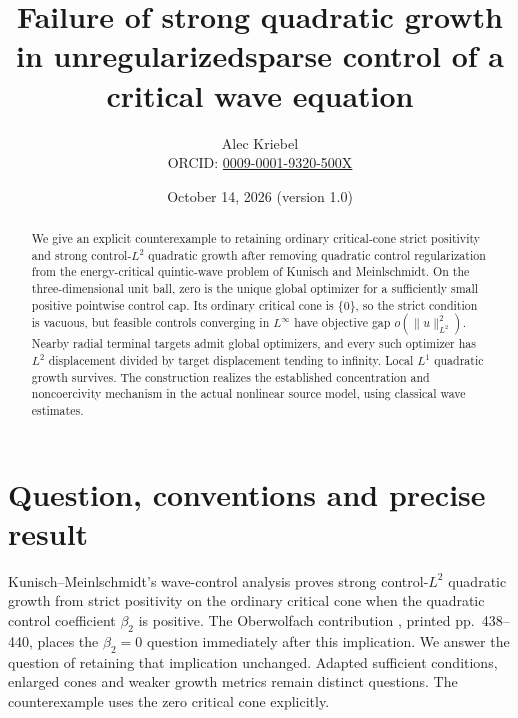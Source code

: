 \documentclass[11pt]{article}
\title{Failure of strong quadratic growth in unregularized\newline sparse control of a critical wave equation}
\author{Alec Kriebel\\\small ORCID: \href{https://orcid.org/0009-0001-9320-500X}{0009-0001-9320-500X}}
\date{October 14, 2026 \quad (version 1.0)}
\newcommand{\norm}[1]{\lVert #1\rVert}
\begin{document}
\maketitle
\begin{abstract}
We give an explicit counterexample to retaining ordinary critical-cone
strict positivity and strong control-$L^2$ quadratic growth after removing
quadratic control regularization from the energy-critical quintic-wave
problem of Kunisch and Meinlschmidt. On the three-dimensional unit ball,
zero is the unique global optimizer for a sufficiently small positive
pointwise control cap. Its ordinary critical cone is $\{0\}$, so the strict
condition is vacuous, but feasible controls converging in $L^\infty$ have
objective gap $o(\norm{u}_{L^2}^2)$. Nearby radial terminal targets admit
global optimizers, and every such optimizer has $L^2$ displacement divided
by target displacement tending to infinity. Local $L^1$ quadratic growth
survives. The construction realizes the established concentration and
noncoercivity mechanism in the actual nonlinear source model, using
classical wave estimates.
\end{abstract}

\section{Question, conventions and precise result}

Kunisch--Meinlschmidt's wave-control analysis \cite{KM} proves strong
control-$L^2$ quadratic growth from strict positivity on the ordinary
critical cone when the quadratic control coefficient $\beta_2$ is positive.
The Oberwolfach contribution \cite{OWR}, printed pp.~438--440, places the
$\beta_2=0$ question immediately after this implication. We answer the
question of retaining that implication unchanged. Adapted sufficient
conditions, enlarged cones and weaker growth metrics remain distinct
questions. The counterexample uses the zero critical cone explicitly.
\end{document}
